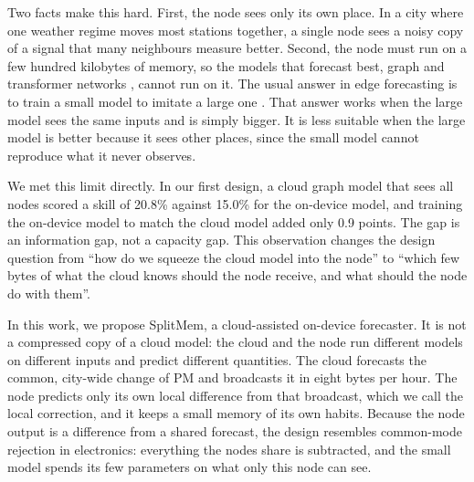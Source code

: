 \documentclass[journal]{IEEEtran}
\begin{document}
Two facts make this hard. First, the node sees only its own place. In a city where one weather regime moves most stations together, a single node sees a noisy copy of a signal that many neighbours measure better. Second, the node must run on a few hundred kilobytes of memory, so the models that forecast best, graph and transformer networks \cite{qi2026bernt,dimri2026transnet,wang2024wddstg}, cannot run on it. The usual answer in edge forecasting is to train a small model to imitate a large one \cite{hinton2015distill,na2026privileged,fu2026rednet,kumar2026kdaqnet}. That answer works when the large model sees the same inputs and is simply bigger. It is less suitable when the large model is better because it sees other places, since the small model cannot reproduce what it never observes.

We met this limit directly. In our first design, a cloud graph model that sees all nodes scored a skill of 20.8\% against 15.0\% for the on-device model, and training the on-device model to match the cloud model added only 0.9 points. The gap is an information gap, not a capacity gap. This observation changes the design question from ``how do we squeeze the cloud model into the node'' to ``which few bytes of what the cloud knows should the node receive, and what should the node do with them''.

In this work, we propose SplitMem, a cloud-assisted on-device forecaster. It is not a compressed copy of a cloud model: the cloud and the node run different models on different inputs and predict different quantities. The cloud forecasts the common, city-wide change of PM and broadcasts it in eight bytes per hour. The node predicts only its own local difference from that broadcast, which we call the local correction, and it keeps a small memory of its own habits. Because the node output is a difference from a shared forecast, the design resembles common-mode rejection in electronics: everything the nodes share is subtracted, and the small model spends its few parameters on what only this node can see.
\end{document}
